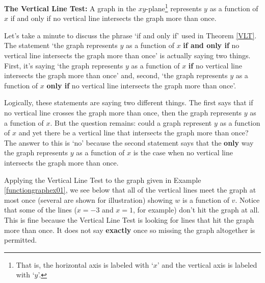 \documentclass{ximera}
\begin{document}
\medskip

\colorbox{ResultColor}{\bbm

\begin{thm}  \textbf{The Vertical Line Test:}   A graph in the $xy$-plane\footnote{That is, the horizontal axis is labeled with `$x$' and the vertical axis is labeled with `$y$'.}  represents $y$ as a function of $x$ if and only if no vertical line intersects the graph more than once.
\label{VLT}

\end{thm}

\ebm}

\bigskip

Let's take a minute to discuss the phrase `if and only if' used in Theorem \ref{VLT}.   The statement `the graph represents $y$ as a function of $x$ \textbf{if and only if} no vertical line intersects the graph more than once' is actually saying two things.  First, it's saying `the graph represents $y$ as a function of $x$  \textbf{if} no vertical line intersects the graph more than once' and, second,  `the graph represents $y$ as a function of $x$  \textbf{only if} no vertical line intersects the graph more than once'.   

\medskip

Logically, these statements are saying two different things. The first says that if no vertical line crosses the graph more than once, then the graph represents $y$ as a function of $x$.  But the question remains:  could a graph represent $y$ as a function of $x$ and yet there be a vertical line that intersects the graph more than once?  The answer to this is `no' because the second statement says that the \textbf{only} way the graph represents $y$ as a function of $x$ is the case when no vertical line intersects the graph more than once.

\medskip

Applying the Vertical Line Test to the graph given in Example \ref{functiongraphex01}, we see below that all of the vertical lines meet the graph at most once (several are shown for illustration) showing $w$ is a function of $v$.  Notice that some of the lines ($x = -3$ and $x = 1$, for example) don't hit the graph at all.  This is fine because the Vertical Line Test is looking for lines that hit the graph more than once.  It does not say \textbf{exactly} once so missing the graph altogether is permitted.
\end{document}
